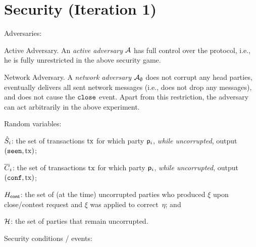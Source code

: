 \section{Security (Iteration 1)}\label{sec:security}

Adversaries:

\begin{mdescription}
\item[Active Adversary.] An \emph{active adversary} $\mathcal{A}$ has full control
  over the protocol, i.e., he is fully unrestricted in the above security game.

 \item[Network Adversary.] A \emph{network adversary} $\mathcal{A}_\emptyset$ does not corrupt
   any head parties, eventually delivers all sent network messages
   (i.e., does not drop any messages), and does not cause the $\mathtt{close}$ event.
   Apart from this restriction, the adversary can act arbitrarily in the above experiment.
\end{mdescription}

\noindent Random variables:

\begin{mitemize}
  \item $\hat{S}_i$: the set of transactions $\mathrm{tx}$ for which party
  $\mathsf p_i$, \emph{while uncorrupted}, output $(\mathtt{seen},\mathrm{tx})$;
  \item $\overline{C}_i$: the set of transactions $\mathrm{tx}$ for which party
  $\mathsf p_i$, \emph{while uncorrupted}, output $(\mathtt{conf},\mathrm{tx})$;
  \item $H_{\mathsf{cont}}$: the set of (at the time) uncorrupted parties who
  produced $\xi$ upon close/contest request and $\xi$ was applied to
  correct~$\eta$; and
  \item $\mathcal H$: the set of parties that remain uncorrupted.
\end{mitemize}


\noindent Security conditions / events:

